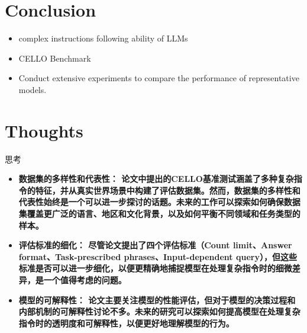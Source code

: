 \documentclass{beamer}
\begin{document}
\begin{frame}
\end{frame}

\section{Conclusion}

\begin{frame}
    \begin{itemize}
        \item {complex instructions following ability of LLMs}
        \item {CELLO Benchmark}
        \item {Conduct extensive experiments to compare the performance of representative models.}
    \end{itemize}
\end{frame}

\section{Thoughts}

\begin{frame}{思考}
    \begin{itemize}
        \item {\bfseries{数据集的多样性和代表性：}\normalfont
            论文中提出的CELLO基准测试涵盖了多种复杂指令的特征，并从真实世界场景中构建了评估数据集。然而，数据集的多样性和代表性始终是一个可以进一步探讨的话题。未来的工作可以探索如何确保数据集覆盖更广泛的语言、地区和文化背景，以及如何平衡不同领域和任务类型的样本。}
        \item {\bfseries{评估标准的细化：}\normalfont
            尽管论文提出了四个评估标准（Count limit、Answer format、Task-prescribed phrases、Input-dependent query），但这些标准是否可以进一步细化，以便更精确地捕捉模型在处理复杂指令时的细微差异，是一个值得考虑的问题。}
        \item {\bfseries{模型的可解释性：}\normalfont
            论文主要关注模型的性能评估，但对于模型的决策过程和内部机制的可解释性讨论不多。未来的研究可以探索如何提高模型在处理复杂指令时的透明度和可解释性，以便更好地理解模型的行为。}
    \end{itemize}
\end{frame}
\end{document}
